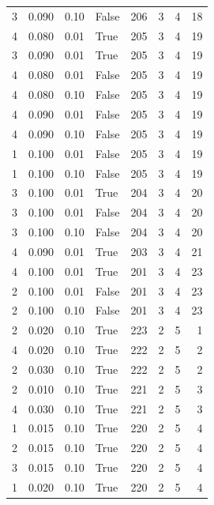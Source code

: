 \documentclass[a4paper,twoside,12pt]{book}
\begin{document}
\begin{table}
\begin{tabular}{rrrlrrrr}
				3 &  0.090 &     0.10 &    False &  206 &  3 &   4 &  18 \\
				4 &  0.080 &     0.01 &     True &  205 &  3 &   4 &  19 \\
				3 &  0.090 &     0.01 &     True &  205 &  3 &   4 &  19 \\
				4 &  0.080 &     0.01 &    False &  205 &  3 &   4 &  19 \\
				4 &  0.080 &     0.10 &    False &  205 &  3 &   4 &  19 \\
				4 &  0.090 &     0.01 &    False &  205 &  3 &   4 &  19 \\
				4 &  0.090 &     0.10 &    False &  205 &  3 &   4 &  19 \\
				1 &  0.100 &     0.01 &    False &  205 &  3 &   4 &  19 \\
				1 &  0.100 &     0.10 &    False &  205 &  3 &   4 &  19 \\
				3 &  0.100 &     0.01 &     True &  204 &  3 &   4 &  20 \\
				3 &  0.100 &     0.01 &    False &  204 &  3 &   4 &  20 \\
				3 &  0.100 &     0.10 &    False &  204 &  3 &   4 &  20 \\
				4 &  0.090 &     0.01 &     True &  203 &  3 &   4 &  21 \\
				4 &  0.100 &     0.01 &     True &  201 &  3 &   4 &  23 \\
				2 &  0.100 &     0.01 &    False &  201 &  3 &   4 &  23 \\
				2 &  0.100 &     0.10 &    False &  201 &  3 &   4 &  23 \\
				2 &  0.020 &     0.10 &     True &  223 &  2 &   5 &   1 \\
				4 &  0.020 &     0.10 &     True &  222 &  2 &   5 &   2 \\
				2 &  0.030 &     0.10 &     True &  222 &  2 &   5 &   2 \\
				2 &  0.010 &     0.10 &     True &  221 &  2 &   5 &   3 \\
				4 &  0.030 &     0.10 &     True &  221 &  2 &   5 &   3 \\
				1 &  0.015 &     0.10 &     True &  220 &  2 &   5 &   4 \\
				2 &  0.015 &     0.10 &     True &  220 &  2 &   5 &   4 \\
				3 &  0.015 &     0.10 &     True &  220 &  2 &   5 &   4 \\
				1 &  0.020 &     0.10 &     True &  220 &  2 &   5 &   4 \\

\end{tabular}
\end{table}
\end{document}
